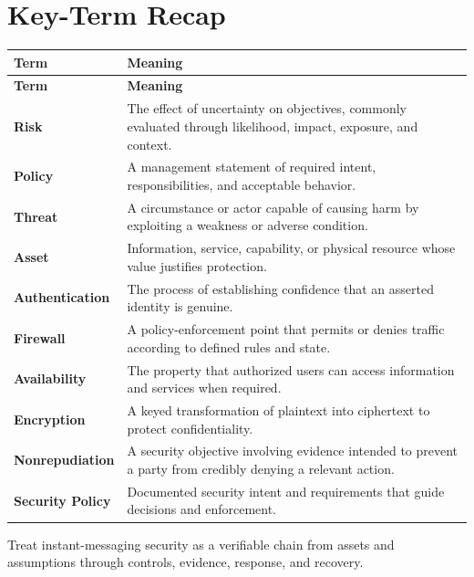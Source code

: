 \documentclass[11pt]{article}
\begin{document}
\section*{Key-Term Recap}
\begin{longtable}{>{\RaggedRight\arraybackslash}p{}>{\RaggedRight\arraybackslash}p{}}
\toprule\rowcolor{Navy}\color{white}\textbf{Term} & \color{white}\textbf{Meaning}\\\midrule
\endfirsthead
\toprule\rowcolor{Navy}\color{white}\textbf{Term} & \color{white}\textbf{Meaning}\\\midrule
\endhead
\textbf{Risk} & The effect of uncertainty on objectives, commonly evaluated through likelihood, impact, exposure, and context. \\\midrule
\textbf{Policy} & A management statement of required intent, responsibilities, and acceptable behavior. \\\midrule
\textbf{Threat} & A circumstance or actor capable of causing harm by exploiting a weakness or adverse condition. \\\midrule
\textbf{Asset} & Information, service, capability, or physical resource whose value justifies protection. \\\midrule
\textbf{Authentication} & The process of establishing confidence that an asserted identity is genuine. \\\midrule
\textbf{Firewall} & A policy-enforcement point that permits or denies traffic according to defined rules and state. \\\midrule
\textbf{Availability} & The property that authorized users can access information and services when required. \\\midrule
\textbf{Encryption} & A keyed transformation of plaintext into ciphertext to protect confidentiality. \\\midrule
\textbf{Nonrepudiation} & A security objective involving evidence intended to prevent a party from credibly denying a relevant action. \\\midrule
\textbf{Security Policy} & Documented security intent and requirements that guide decisions and enforcement. \\\midrule
\bottomrule
\end{longtable}
\begin{takeawaybox}
Treat instant-messaging security as a verifiable chain from assets and assumptions through controls, evidence, response, and recovery.
\end{takeawaybox}
\end{document}
